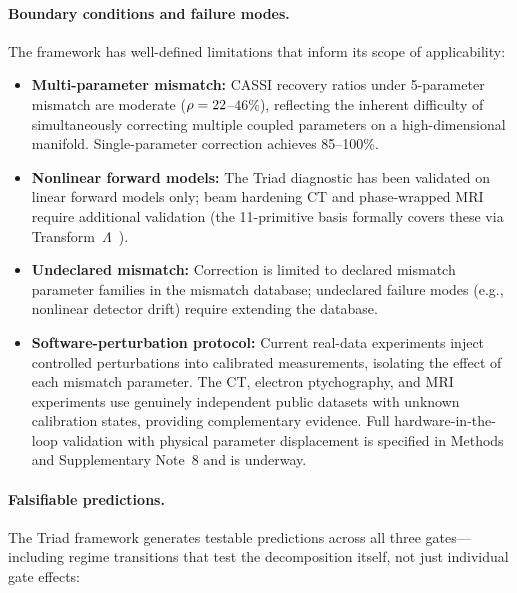 \paragraph{Boundary conditions and failure modes.}
The framework has well-defined limitations that inform its scope of applicability:
\begin{itemize}
\item \textbf{Multi-parameter mismatch:} CASSI recovery ratios under 5-parameter mismatch are moderate ($\rho = 22$--$46\%$), reflecting the inherent difficulty of simultaneously correcting multiple coupled parameters on a high-dimensional manifold. Single-parameter correction achieves 85--100\%.
\item \textbf{Nonlinear forward models:} The Triad diagnostic has been validated on linear forward models only; beam hardening CT and phase-wrapped MRI require additional validation (the 11-primitive basis formally covers these via Transform~$\Lambda$~\cite{yang2026fpt}).
\item \textbf{Undeclared mismatch:} Correction is limited to declared mismatch parameter families in the mismatch database; undeclared failure modes (e.g., nonlinear detector drift) require extending the database.
\item \textbf{Software-perturbation protocol:} Current real-data experiments inject controlled perturbations into calibrated measurements, isolating the effect of each mismatch parameter. The CT, electron ptychography, and MRI experiments use genuinely independent public datasets with unknown calibration states, providing complementary evidence. Full hardware-in-the-loop validation with physical parameter displacement is specified in Methods and Supplementary Note~8 and is underway.
\end{itemize}

\paragraph{Falsifiable predictions.}
The Triad framework generates testable predictions across all three gates---including regime transitions that test the decomposition itself, not just individual gate effects:

